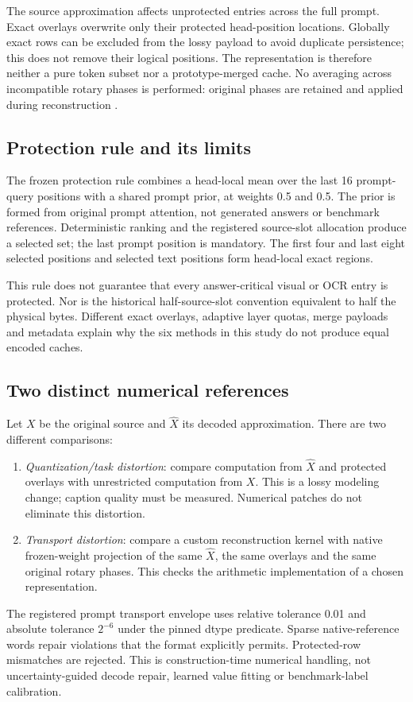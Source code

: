 \documentclass{article}
\begin{document}
The source approximation affects unprotected entries across the full
prompt. Exact overlays overwrite only their protected head-position
locations. Globally exact rows can be excluded from the lossy payload to
avoid duplicate persistence; this does not remove their logical positions.
The representation is therefore neither a pure token subset nor a
prototype-merged cache. No averaging across incompatible rotary phases is
performed: original phases are retained and applied during reconstruction
\citep{su2021rope}.

\subsection{Protection rule and its limits}
The frozen protection rule combines a head-local mean over the last 16
prompt-query positions with a shared prompt prior, at weights 0.5 and
0.5. The prior is formed from original prompt attention, not generated
answers or benchmark references. Deterministic ranking and the registered
source-slot allocation produce a selected set; the last prompt position
is mandatory. The first four and last eight selected positions and
selected text positions form head-local exact regions.

This rule does not guarantee that every answer-critical visual or OCR
entry is protected. Nor is the historical half-source-slot convention
equivalent to half the physical bytes. Different exact overlays,
adaptive layer quotas, merge payloads and metadata explain why the six
methods in this study do not produce equal encoded caches.

\subsection{Two distinct numerical references}
Let $X$ be the original source and $\widehat X$ its decoded approximation.
There are two different comparisons:
\begin{enumerate}
\item \emph{Quantization/task distortion}: compare computation from
      $\widehat X$ and protected overlays with unrestricted computation
      from $X$. This is a lossy modeling change; caption quality must be
      measured. Numerical patches do not eliminate this distortion.
\item \emph{Transport distortion}: compare a custom reconstruction
      kernel with native frozen-weight projection of the same
      $\widehat X$, the same overlays and the same original rotary phases.
      This checks the arithmetic implementation of a chosen representation.
\end{enumerate}
The registered prompt transport envelope uses relative tolerance 0.01 and
absolute tolerance $2^{-6}$ under the pinned dtype predicate. Sparse
native-reference words repair violations that the format explicitly
permits. Protected-row mismatches are rejected. This is construction-time
numerical handling, not uncertainty-guided decode repair, learned value
fitting or benchmark-label calibration.
\end{document}
